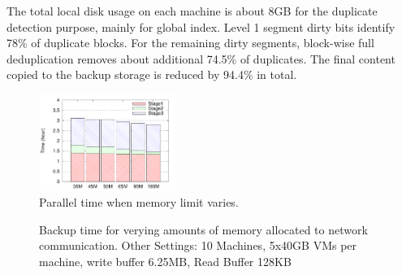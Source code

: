 The total local disk usage on each machine is about 8GB for the duplicate detection purpose,
mainly for global index. 
Level 1 segment dirty bits identify 78\% of duplicate blocks. For the remaining dirty segments,
block-wise full deduplication removes about additional 74.5\% of duplicates.
The final content copied to the backup storage is reduced by 94.4\% in total.

\begin{figure}
\centering
\includegraphics[width=0.4\textwidth]{mem_time.pdf}
\caption{ Parallel time when memory limit varies.}
\label{fig:memory}
\end{figure}

\begin{figure}[ht]
  \centering
  \caption{Backup time for verying amounts of memory allocated to network communication. Other Settings: 10 Machines, 5x40GB VMs per machine, write buffer 6.25MB, Read Buffer 128KB}
  \label{fig:mpibuf-mem}
\end{figure}


